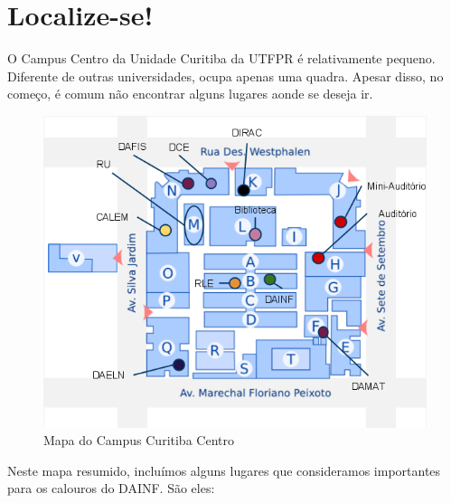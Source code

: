 \documentclass[a4paper,12pt,openany]{article}
\begin{document}
\newpage
\section{Localize-se!}

O Campus Centro da Unidade Curitiba da UTFPR é relativamente pequeno. Diferente de outras universidades, ocupa apenas uma quadra. Apesar disso, no começo, é comum não encontrar alguns lugares aonde se deseja ir.

	\begin{figure}[ht!]  \centering
		\includegraphics[scale=0.7]{mapa.png}
		\caption{Mapa do Campus Curitiba Centro}
		\label{fig01}
	\end{figure}

Neste mapa resumido, incluímos alguns lugares que consideramos importantes para os calouros do 
DAINF. São eles:
\end{document}
